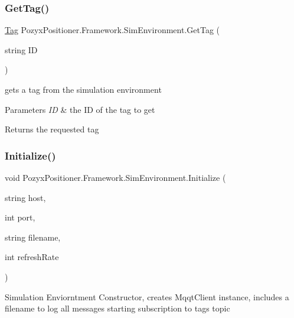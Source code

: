 \subsubsection{\texorpdfstring{Get\+Tag()}{GetTag()}}
{\footnotesize\ttfamily \hyperlink{class_pozyx_positioner_1_1_framework_1_1_tag}{Tag} Pozyx\+Positioner.\+Framework.\+Sim\+Environment.\+Get\+Tag (\begin{DoxyParamCaption}\item[{string}]{ID }\end{DoxyParamCaption})}



gets a tag from the simulation environment 


\begin{DoxyParams}{Parameters}
{\em ID} & the ID of the tag to get\\
\hline
\end{DoxyParams}
\begin{DoxyReturn}{Returns}
the requested tag 
\end{DoxyReturn}
\mbox{\label{class_pozyx_positioner_1_1_framework_1_1_sim_environment_ad559e17b83e87b9121d3ffd9c08e10b4}} 
\subsubsection{\texorpdfstring{Initialize()}{Initialize()}\hspace{0.1cm}{\footnotesize\ttfamily [1/3]}}
{\footnotesize\ttfamily void Pozyx\+Positioner.\+Framework.\+Sim\+Environment.\+Initialize (\begin{DoxyParamCaption}\item[{string}]{host,  }\item[{int}]{port,  }\item[{string}]{filename,  }\item[{int}]{refresh\+Rate }\end{DoxyParamCaption})}



Simulation Enviorntment Constructor, creates Mqqt\+Client instance, includes a filename to log all messages starting subscription to tags topic 



